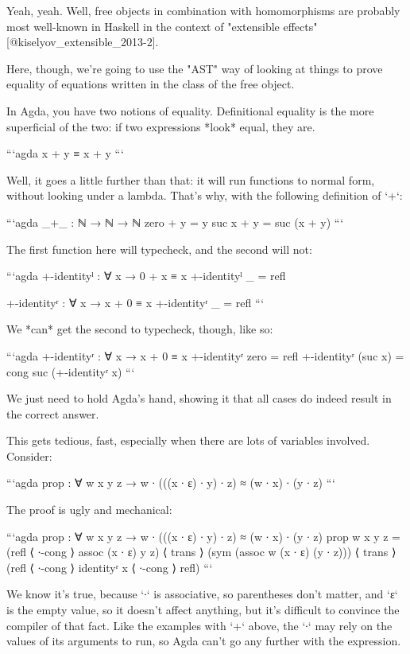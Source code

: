 \documentclass{article}
\begin{document}
Yeah, yeah. Well, free objects in combination with homomorphisms are probably
most well-known in Haskell in the context of "extensible effects"
[@kiselyov_extensible_2013-2].

Here, though, we're going to use the "AST" way of looking at things to prove
equality of equations written in the class of the free object.

In Agda, you have two notions of equality. Definitional equality is the more
superficial of the two: if two expressions *look* equal, they are.

```agda
x + y ≡ x + y
```

Well, it goes a little further than that: it will run functions to normal form,
without looking under a lambda. That's why, with the following definition of
`+`:

```agda
_+_ : ℕ → ℕ → ℕ
zero + y = y
suc x + y = suc (x + y)
```

The first function here will typecheck, and the second will not:

```agda
+-identityˡ : ∀ x → 0 + x ≡ x
+-identityˡ _ = refl

+-identityʳ : ∀ x → x + 0 ≡ x
+-identityʳ _ = refl
```

We *can* get the second to typecheck, though, like so:

```agda
+-identityʳ : ∀ x → x + 0 ≡ x
+-identityʳ zero = refl
+-identityʳ (suc x) = cong suc (+-identityʳ x)
```

We just need to hold Agda's hand, showing it that all cases do indeed result in
the correct answer.

This gets tedious, fast, especially when there are lots of variables involved.
Consider:

```agda
prop : ∀ w x y z →  w ∙ (((x ∙ ε) ∙ y) ∙ z) ≈ (w ∙ x) ∙ (y ∙ z)
```

The proof is ugly and mechanical:

```agda
prop : ∀ w x y z →  w ∙ (((x ∙ ε) ∙ y) ∙ z) ≈ (w ∙ x) ∙ (y ∙ z)
prop w x y z =
  (refl ⟨ ∙-cong ⟩ assoc (x ∙ ε) y z)
    ⟨ trans ⟩
  (sym (assoc w (x ∙ ε) (y ∙ z)))
    ⟨ trans ⟩
  (refl ⟨ ∙-cong ⟩ identityʳ x ⟨ ∙-cong ⟩ refl)
```

We know it's true, because `∙` is associative, so parentheses don't matter, and
`ε` is the empty value, so it doesn't affect anything, but it's difficult to
convince the compiler of that fact. Like the examples with `+` above, the `∙`
may rely on the values of its arguments to run, so Agda can't go any further
with the expression.
\end{document}
